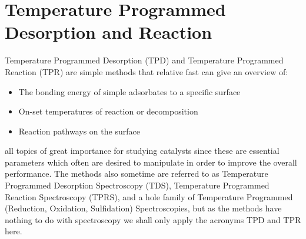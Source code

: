 \newpage
\chapter{Temperature Programmed Desorption and Reaction}
Temperature Programmed Desorption (TPD) and Temperature Programmed Reaction
(TPR) are  simple methods that relative fast can give an overview of:
\begin{itemize}
\item The bonding energy of simple adsorbates to a specific surface
\item On-set  temperatures of reaction or decomposition
\item Reaction pathways on the surface
\end{itemize}
all topics of great importance for studying catalysts since these are essential parameters which often are desired to manipulate in order to improve the overall performance. The  methods also sometime are referred to as Temperature Programmed Desorption Spectroscopy (TDS), Temperature Programmed Reaction Spectroscopy (TPRS), and a hole family of Temperature Programmed (Reduction, Oxidation, Sulfidation) Spectroscopies, but as the methods have nothing to do with spectroscopy we shall only apply the  acronyms TPD and TPR here.

